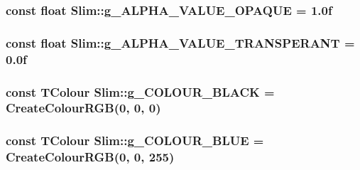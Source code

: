 \subsubsection[{g\+\_\+\+A\+L\+P\+H\+A\+\_\+\+V\+A\+L\+U\+E\+\_\+\+O\+P\+A\+Q\+U\+E}]{\setlength{\rightskip}{0pt plus 5cm}const float Slim\+::g\+\_\+\+A\+L\+P\+H\+A\+\_\+\+V\+A\+L\+U\+E\+\_\+\+O\+P\+A\+Q\+U\+E = 1.\+0f}\label{namespace_slim_ad94a83e754d3f801b7d684641e650f76}
\hypertarget{namespace_slim_a5c452a9999f4307444c7496757b290c7}{}
\subsubsection[{g\+\_\+\+A\+L\+P\+H\+A\+\_\+\+V\+A\+L\+U\+E\+\_\+\+T\+R\+A\+N\+S\+P\+E\+R\+A\+N\+T}]{\setlength{\rightskip}{0pt plus 5cm}const float Slim\+::g\+\_\+\+A\+L\+P\+H\+A\+\_\+\+V\+A\+L\+U\+E\+\_\+\+T\+R\+A\+N\+S\+P\+E\+R\+A\+N\+T = 0.\+0f}\label{namespace_slim_a5c452a9999f4307444c7496757b290c7}
\hypertarget{namespace_slim_a8f55af55b9d6bd5d1a247ae77239e9ec}{}
\subsubsection[{g\+\_\+\+C\+O\+L\+O\+U\+R\+\_\+\+B\+L\+A\+C\+K}]{\setlength{\rightskip}{0pt plus 5cm}const {\bf T\+Colour} Slim\+::g\+\_\+\+C\+O\+L\+O\+U\+R\+\_\+\+B\+L\+A\+C\+K = {\bf Create\+Colour\+R\+G\+B}(0, 0, 0)}\label{namespace_slim_a8f55af55b9d6bd5d1a247ae77239e9ec}
\hypertarget{namespace_slim_a2ff65ee94b0f7dbb4cc7614b6d34b075}{}
\subsubsection[{g\+\_\+\+C\+O\+L\+O\+U\+R\+\_\+\+B\+L\+U\+E}]{\setlength{\rightskip}{0pt plus 5cm}const {\bf T\+Colour} Slim\+::g\+\_\+\+C\+O\+L\+O\+U\+R\+\_\+\+B\+L\+U\+E = {\bf Create\+Colour\+R\+G\+B}(0, 0, 255)}\label{namespace_slim_a2ff65ee94b0f7dbb4cc7614b6d34b075}
\hypertarget{namespace_slim_a3f18a21d67a8e4342f45d6dc38491e84}{}
